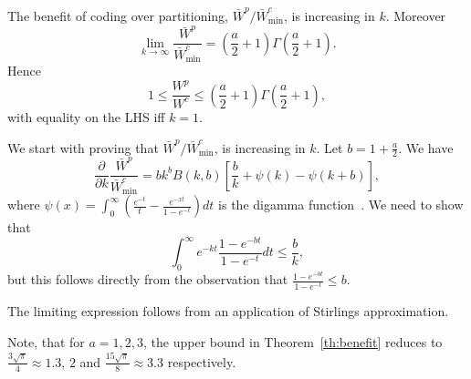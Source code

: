 \begin{theorem} \label{th:benefit}
The benefit of coding over partitioning, $\bar W^p/\bar W^c_{\mathrm{min}}$, is increasing in $k$. Moreover
\begin{equation}
\lim_{k\to\infty} \frac{\bar W^p}{\bar W^c_{\mathrm{min}}} = \left(\frac{a}{2}+1\right)\Gamma\left(\frac{a}{2}+1\right).
\end{equation}
Hence
\begin{equation}
1 \leq \frac{W^p}{W^c} \leq \left(\frac{a}{2}+1\right)\Gamma\left(\frac{a}{2}+1\right),
\end{equation}
with equality on the LHS iff $k=1$.
\end{theorem}
\begin{IEEEproof}
We start with proving that $\bar W^p/\bar W^c_{\mathrm{min}}$, is increasing in $k$.
Let $b=1+\frac{a}{2}$. We have
\begin{equation}
 \frac{\partial}{\partial k}\frac{\bar W^p}{\bar W^c_{\mathrm{min}}} = b k^b B(k,b)\left[ \frac{b}{k} + \psi(k) - \psi(k+b)\right],
\end{equation}
where $\psi(x) = \int_0^\infty \left( \frac{e^{-t}}{t} - \frac{e^{-xt}}{1-e^{-t}}\right)dt$ is the digamma function~\cite{abramowitz1974handbook}. We need to show that
\begin{equation}
 \int_0^\infty e^{-kt} \frac{1-e^{-bt}}{1-e^{-t}}dt \leq \frac{b}{k},
\end{equation}
but this follows directly from the observation that $\frac{1-e^{-bt}}{1-e^{-t}}\leq b$.

The limiting expression follows from an application of Stirlings approximation.
\end{IEEEproof}
Note, that for $a=1,2,3$, the upper bound in Theorem~\ref{th:benefit} reduces to $\frac{3\sqrt{\pi}}{4}\approx 1.3$, $2$ and $\frac{15\sqrt{\pi}}{8}\approx 3.3$ respectively.


